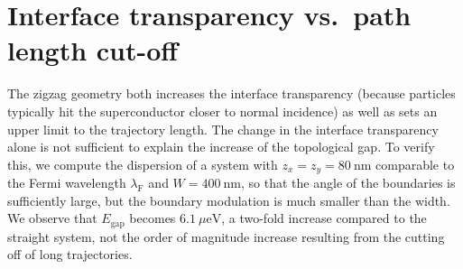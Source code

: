 \section{Interface transparency vs.~path length cut-off}

The zigzag geometry both increases the interface transparency (because particles typically hit the superconductor
closer to normal incidence) as well as sets an upper limit to the trajectory length.
The change in the interface transparency alone is not sufficient to explain the increase of the topological gap.
To verify this, we compute the dispersion of a system with $z_x = z_y = \SI{80}{\nm}$ comparable to the Fermi wavelength $\lambda_\textrm{F}$ and $W=\SI{400}{\nm}$, so that the angle of the boundaries is sufficiently large, but the boundary modulation is much smaller than the width.
We observe that $E_\textrm{gap}$ becomes $\SI{6.1}{\mu \eV}$, a two-fold increase compared to the straight system, not the order of magnitude increase resulting from the cutting off of long trajectories.

